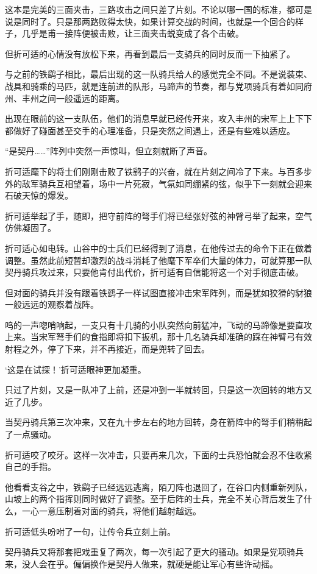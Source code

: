 这本是完美的三面夹击，三路攻击之间只差了片刻。不论以哪一国的标准，都可是说是同时了。只是那两路败得太快，如果计算交战的时间，也就是一个回合的样子，几乎是甫一接阵便被击败，让三面夹击蜕变成了各个击破。

但折可适的心情没有放松下来，再看到最后一支骑兵的同时反而一下抽紧了。

与之前的铁鹞子相比，最后出现的这一队骑兵给人的感觉完全不同。不是说装束、战具和骑乘的马匹，就是连前进的队形，马蹄声的节奏，都与党项骑兵有着如同府州、丰州之间一般遥远的距离。

出现在眼前的这一支队伍，他们的消息早就已经传开来，攻入丰州的宋军上上下下都做好了碰面甚至交手的心理准备，只是突然之间遇上，还是有些难以适应。

“是契丹……”阵列中突然一声惊叫，但立刻就断了声音。

折可适麾下的将士们刚刚击败了铁鹞子的兴奋，就在片刻之间冷了下来。与百多步外的敌军骑兵互相望着，场中一片死寂，气氛如同绷紧的弦，似乎下一刻就会迎来石破天惊的爆发。

折可适举起了手，随即，把守前阵的弩手们将已经张好弦的神臂弓举了起来，空气仿佛凝固了。

折可适心如电转。山谷中的士兵们已经得到了消息，在他传过去的命令下正在做着调整。虽然此前短暂却激烈的战斗消耗了他麾下军卒们大量的体力，可就算那一队契丹骑兵攻过来，只要他肯付出代价，折可适有自信能将这一个对手彻底击破。

但对面的骑兵并没有跟着铁鹞子一样试图直接冲击宋军阵列，而是犹如狡猾的豺狼一般远远的观察着战阵。

呜的一声唿哨响起，一支只有十几骑的小队突然向前猛冲，飞动的马蹄像是要直攻上来。当宋军弩手们的食指即将扣下扳机，那十几名骑兵却准确的踩在神臂弓有效射程之外，停了下来，并不再接近，而是兜转了回去。

‘这是在试探！’折可适眼神更加凝重。

只过了片刻，又是一队冲了上前，还是冲到一半就转回，只是这一次回转的地方又近了几步。

当契丹骑兵第三次冲来，又在九十步左右的地方回转，身在箭阵中的弩手们稍稍起了一点骚动。

折可适咬了咬牙。这样一次冲击，只要再来几次，下面的士兵恐怕就会忍不住收紧自己的手指。

他看看支谷之中，铁鹞子已经远远逃离，陌刀阵也退回了，在谷口内侧重新列队，山坡上的两个指挥则同时做好了调整。至于后阵的士兵，完全不关心背后发生了什么，一心一意压制着对面的骑兵，将他们越射越远。

折可适低头吩咐了一句，让传令兵立刻上前。

契丹骑兵又将那套把戏重复了两次，每一次引起了更大的骚动。如果是党项骑兵来，没人会在乎。偏偏换作是契丹人做来，就硬是能让军心有些许动摇。

